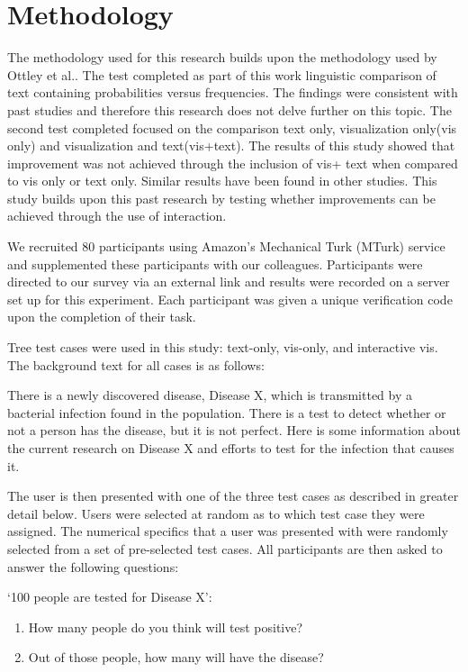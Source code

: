 \section{Methodology}
The methodology used for this research builds upon the methodology used by
Ottley et al.\cite{Ottley2016}. The test completed as part of this work 
linguistic comparison of text containing probabilities versus frequencies.
The findings were consistent with past studies and therefore this research
does not delve further on this topic. The second test completed focused on
the comparison text only, visualization only(vis only) and visualization and
text(vis+text). The results of this study showed that improvement was not
achieved through the inclusion of vis+ text when compared to vis only or text
only. Similar results have been found in other studies. This study builds
upon this past research by testing whether improvements can be achieved
through the use of interaction.

We recruited 80 participants using Amazon's Mechanical Turk (MTurk) service and supplemented these participants with our colleagues. Participants were directed to our survey via an external link and results were recorded on a server set up for this experiment. Each participant was given a unique verification code upon the completion of their task. 

Tree test cases were used in this study: text-only, vis-only, and interactive vis. The background text for all cases is as follows:

\begin{displayquote}
    There is a newly discovered disease, Disease X, which is transmitted by a bacterial infection found in the population. There is a test to detect whether or not a person has the disease, but it is not perfect. Here is some information about the current research on Disease X and efforts to test for the infection that causes it.
\end{displayquote}

The user is then presented with one of the three test cases as described in greater detail below. Users were selected at random as to which test case they were assigned. The numerical specifics that a user was presented with were randomly selected from a set of pre-selected test cases. All participants are then asked to answer the following questions:

‘100 people are tested for Disease X’:
\begin{enumerate}
    \item How many people do you think will test positive?
    \item Out of those people, how many will have the disease? 
\end{enumerate}

